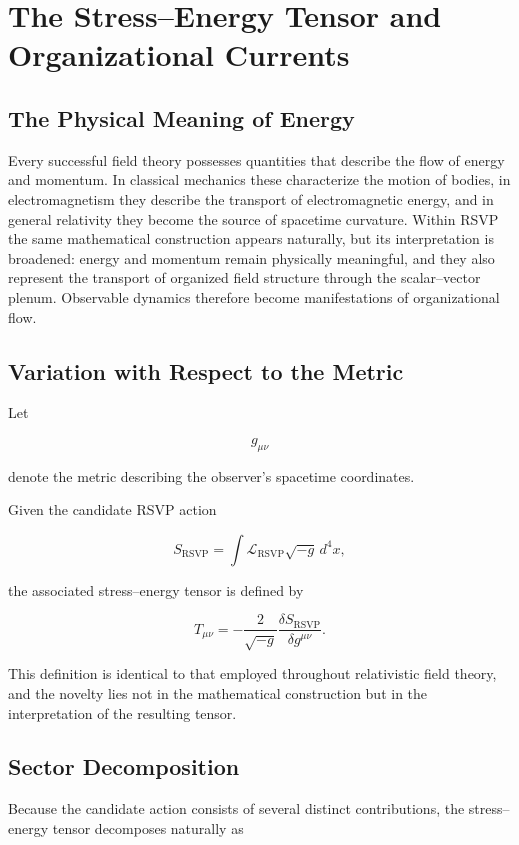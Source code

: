 \documentclass[11pt,oneside]{book}
\numberwithin{equation}{chapter}
\theoremstyle{definition}
\theoremstyle{plain}
\begin{document}
\chapter{The Stress--Energy Tensor and Organizational Currents}

\section{The Physical Meaning of Energy}

Every successful field theory possesses quantities that describe the flow of energy and momentum. In classical mechanics these characterize the motion of bodies, in electromagnetism they describe the transport of electromagnetic energy, and in general relativity they become the source of spacetime curvature. Within RSVP the same mathematical construction appears naturally, but its interpretation is broadened: energy and momentum remain physically meaningful, and they also represent the transport of organized field structure through the scalar--vector plenum. Observable dynamics therefore become manifestations of organizational flow.

\section{Variation with Respect to the Metric}

Let

\[
g_{\mu\nu}
\]

denote the metric describing the observer's spacetime coordinates.

Given the candidate RSVP action

\[
S_{\mathrm{RSVP}}
=
\int
\mathcal L_{\mathrm{RSVP}}
\sqrt{-g}\,
d^4x,
\]

the associated stress--energy tensor is defined by

\[
\boxed{
T_{\mu\nu}
=
-
\frac{2}{\sqrt{-g}}
\frac{\delta S_{\mathrm{RSVP}}}
{\delta g^{\mu\nu}}.
}
\]

This definition is identical to that employed throughout relativistic field theory, and the novelty lies not in the mathematical construction but in the interpretation of the resulting tensor.

\section{Sector Decomposition}

Because the candidate action consists of several distinct contributions, the
stress--energy tensor decomposes naturally as
\end{document}
